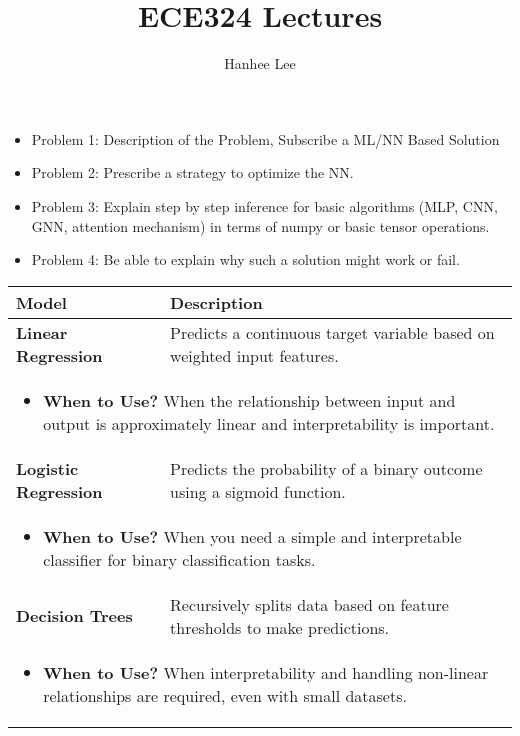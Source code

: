 \documentclass{article}
\title{ECE324 Lectures}
\author{Hanhee Lee}
\begin{document}
\begin{itemize}
    \item Problem 1: Description of the Problem, Subscribe a ML/NN Based Solution
    \item Problem 2: Prescribe a strategy to optimize the NN.
    \item Problem 3: Explain step by step inference for basic algorithms (MLP, CNN, GNN, attention mechanism) in terms of numpy or basic tensor operations.
    \item Problem 4: Be able to explain why such a solution might work or fail.
\end{itemize}
\newpage

\begin{summary}
    \begin{center}
        \begin{tabular}{ll}
        \toprule
        \textbf{Model} & \textbf{Description} \\
        \midrule
        \textbf{Linear Regression} & Predicts a continuous target variable based on weighted input features. \\
        \multicolumn{2}{p{\linewidth}}{
        \begin{itemize}
            \item \textbf{When to Use?} When the relationship between input and output is approximately linear and interpretability is important.
        \end{itemize}} \\
        \midrule
        \textbf{Logistic Regression} & Predicts the probability of a binary outcome using a sigmoid function. \\
        \multicolumn{2}{p{\linewidth}}{
        \begin{itemize}
            \item \textbf{When to Use?} When you need a simple and interpretable classifier for binary classification tasks.
        \end{itemize}} \\
        \midrule
        \textbf{Decision Trees} & Recursively splits data based on feature thresholds to make predictions. \\
        \multicolumn{2}{p{\linewidth}}{
        \begin{itemize}
            \item \textbf{When to Use?} When interpretability and handling non-linear relationships are required, even with small datasets.
        \end{itemize}} \\

\end{tabular}
\end{center}
\end{summary}
\end{document}
